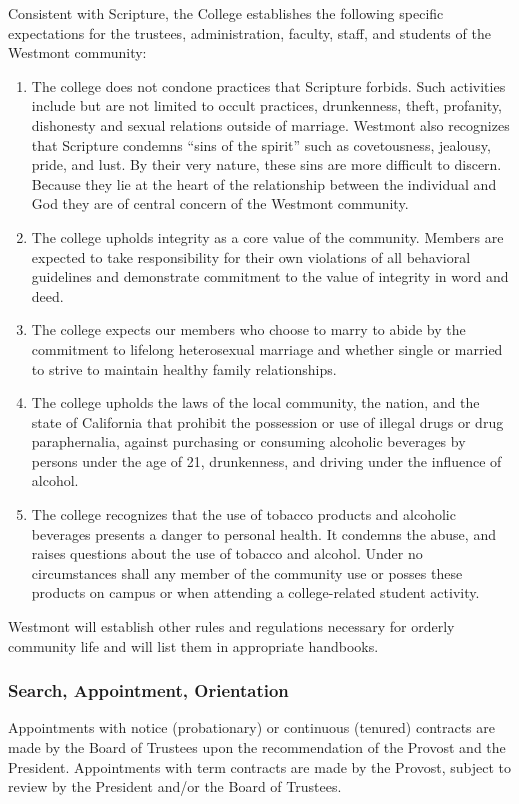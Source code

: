 \begin{enumerate}[label=\alph*)]
{							\quad Consistent with Scripture, the College establishes the following specific expectations for the trustees, administration, faculty, staff, and students of the Westmont community:
							\begin{enumerate}[label=\arabic*)]
								\item{The college does not condone practices that Scripture forbids.  Such activities include but are not limited to occult practices, drunkenness, theft, profanity, dishonesty and sexual relations outside of marriage.  Westmont also recognizes that Scripture condemns ``sins of the spirit'' such as covetousness, jealousy, pride, and lust.  By their very nature, these sins are more difficult to discern.  Because they lie at the heart of the relationship between the individual and God they are of central concern of the Westmont community.}
								\item{The college upholds integrity as a core value of the community.  Members are expected to take responsibility for their own violations of all behavioral guidelines and demonstrate commitment to the value of integrity in word and deed.}
								\item{The college expects our members who choose to marry to abide by the commitment to lifelong heterosexual marriage and whether single or married to strive to maintain healthy family relationships.}
								\item{The college upholds the laws of the local community, the nation, and the state of California that prohibit the possession or use of illegal drugs or drug paraphernalia, against purchasing or consuming alcoholic beverages by persons under the age of 21, drunkenness, and driving under the influence of alcohol.}
								\item{The college recognizes that the use of tobacco products and alcoholic beverages presents a danger to personal health.  It condemns the abuse, and raises questions about the use of tobacco and alcohol.  Under no circumstances shall any member of the community use or posses these products on campus or when attending a college-related student activity.}
							\end{enumerate}
							\quad Westmont will establish other rules and regulations necessary for orderly community life and will list them in appropriate handbooks.
						}
					\end{enumerate}
		\subsubsection{Search, Appointment, Orientation}
			Appointments with notice (probationary) or continuous (tenured) contracts are made by the Board of Trustees upon the recommendation of the Provost and the President. Appointments with term contracts are made by the Provost, subject to review by the President and/or the Board of Trustees.

